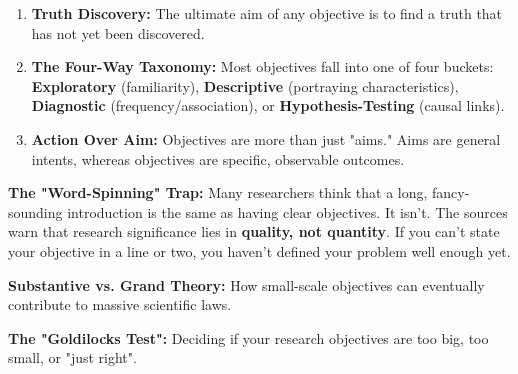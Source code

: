 \documentclass{report}
\begin{document}
\begin{layerTakeaways}
    \begin{enumerate}
        \item \textbf{Truth Discovery:} The ultimate aim of any objective is to find a truth that has not yet been discovered.
        \item \textbf{The Four-Way Taxonomy:} Most objectives fall into one of four buckets: \textbf{Exploratory} (familiarity), \textbf{Descriptive} (portraying characteristics), \textbf{Diagnostic} (frequency/association), or \textbf{Hypothesis-Testing} (causal links).
        \item \textbf{Action Over Aim:} Objectives are more than just "aims." Aims are general intents, whereas objectives are specific, observable outcomes.
    \end{enumerate}
\end{layerTakeaways}

\begin{misconception}
    \textbf{The "Word-Spinning" Trap:} Many researchers think that a long, fancy-sounding introduction is the same as having clear objectives. It isn't. The sources warn that research significance lies in \textbf{quality, not quantity}. If you can't state your objective in a line or two, you haven't defined your problem well enough yet.
\end{misconception}

\begin{optionalExplore}
    \textbf{Substantive vs. Grand Theory:} How small-scale objectives can eventually contribute to massive scientific laws.
    
    
    \textbf{The "Goldilocks Test":} Deciding if your research objectives are too big, too small, or "just right".
\end{optionalExplore}
\end{document}
